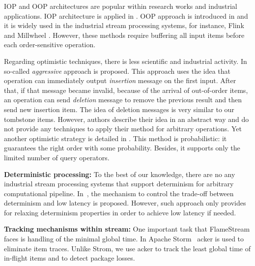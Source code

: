 IOP and OOP architectures are popular within research works and industrial applications. IOP architecture is applied in \cite{Cranor:2003:GSD:872757.872838, Abadi:2003:ANM:950481.950485, Arasu:2006:CCQ:1146461.1146463, Ding:2004:EWJ:1031171.1031189, Hammad:2003:SSW:1315451.1315478, Hammad:2005:OIE:1116877.1116897}. OOP approach is introduced in \cite{Li:2008:OPN:1453856.1453890} and it is widely used in the industrial stream processing systems, for instance, Flink \cite{carbone2015apache} and Millwheel \cite{Akidau:2013:MFS:2536222.2536229}. However, these methods require buffering all input items before each order-sensitive operation.

Regarding optimistic techniques, there is less scientific and industrial activity. In \cite{Wei:2009:SSO:1559845.1559973} so-called {\it aggressive} approach is proposed. This approach uses the idea that operation can immediately output {\it insertion} message on the first input. After that, if that message became invalid, because of the arrival of out-of-order items, an operation can send {\it deletion} message to remove the previous result and then send new insertion item. The idea of deletion messages is very similar to our tombstone items. However, authors describe their idea in an abstract way and do not provide any techniques to apply their method for arbitrary operations. Yet another optimistic strategy is detailed in \cite{Li2011}. This method is probabilistic: it guarantees the right order with some probability. Besides, it supports only the limited number of query operators.

{\bf Deterministic processing:}
To the best of our knowledge, there are no any industrial stream processing systems that support determinism for arbitrary computational pipeline. In~\cite{Zacheilas:2017:MDS:3093742.3093921}, the mechanism to control the trade-off between determinism and low latency is proposed. However, such approach only provides for relaxing determinism properties in order to achieve low latency if needed.

{\bf Tracking mechanisms within stream:}
One important task that FlameStream faces is handling of the minimal global time. In Apache Storm~\cite{apache:storm} acker is used to eliminate item traces. Unlike Strom, we use acker to track the least global time of in-flight items and to detect package losses.
